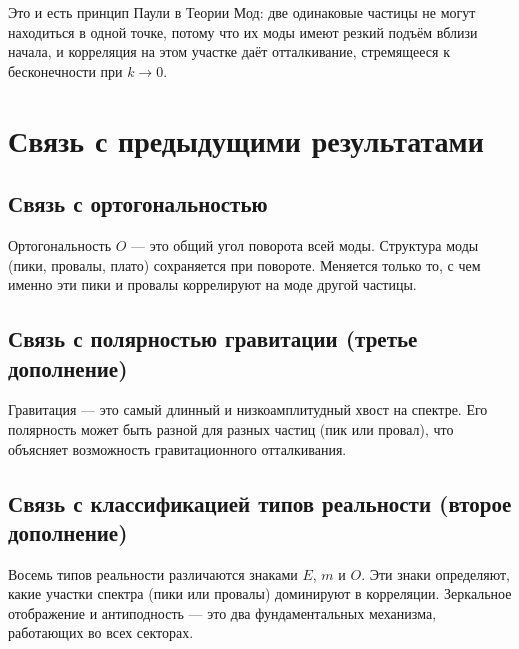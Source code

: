 \documentclass[12pt,a4paper]{article}
\begin{document}
Это и есть принцип Паули в Теории Мод: две одинаковые частицы не могут находиться в одной точке, потому что их моды имеют резкий подъём вблизи начала, и корреляция на этом участке даёт отталкивание, стремящееся к бесконечности при $k \to 0$.

\section{Связь с предыдущими результатами}

\subsection{Связь с ортогональностью}
Ортогональность $O$ --- это общий угол поворота всей моды. Структура моды (пики, провалы, плато) сохраняется при повороте. Меняется только то, с чем именно эти пики и провалы коррелируют на моде другой частицы.

\subsection{Связь с полярностью гравитации (третье дополнение)}
Гравитация --- это самый длинный и низкоамплитудный хвост на спектре. Его полярность может быть разной для разных частиц (пик или провал), что объясняет возможность гравитационного отталкивания.

\subsection{Связь с классификацией типов реальности (второе дополнение)}
Восемь типов реальности различаются знаками $E$, $m$ и $O$. Эти знаки определяют, какие участки спектра (пики или провалы) доминируют в корреляции. Зеркальное отображение и антиподность --- это два фундаментальных механизма, работающих во всех секторах.
\end{document}
